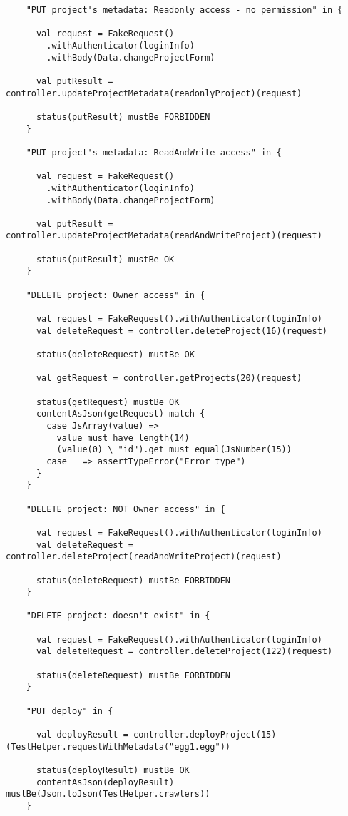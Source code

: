 \begin{lstlisting}
    "PUT project's metadata: Readonly access - no permission" in {

      val request = FakeRequest()
        .withAuthenticator(loginInfo)
        .withBody(Data.changeProjectForm)

      val putResult = controller.updateProjectMetadata(readonlyProject)(request)

      status(putResult) mustBe FORBIDDEN
    }

    "PUT project's metadata: ReadAndWrite access" in {

      val request = FakeRequest()
        .withAuthenticator(loginInfo)
        .withBody(Data.changeProjectForm)

      val putResult = controller.updateProjectMetadata(readAndWriteProject)(request)

      status(putResult) mustBe OK
    }

    "DELETE project: Owner access" in {

      val request = FakeRequest().withAuthenticator(loginInfo)
      val deleteRequest = controller.deleteProject(16)(request)

      status(deleteRequest) mustBe OK

      val getRequest = controller.getProjects(20)(request)

      status(getRequest) mustBe OK
      contentAsJson(getRequest) match {
        case JsArray(value) =>
          value must have length(14)
          (value(0) \ "id").get must equal(JsNumber(15))
        case _ => assertTypeError("Error type")
      }
    }

    "DELETE project: NOT Owner access" in {

      val request = FakeRequest().withAuthenticator(loginInfo)
      val deleteRequest = controller.deleteProject(readAndWriteProject)(request)

      status(deleteRequest) mustBe FORBIDDEN
    }

    "DELETE project: doesn't exist" in {

      val request = FakeRequest().withAuthenticator(loginInfo)
      val deleteRequest = controller.deleteProject(122)(request)

      status(deleteRequest) mustBe FORBIDDEN
    }

    "PUT deploy" in {

      val deployResult = controller.deployProject(15)(TestHelper.requestWithMetadata("egg1.egg"))

      status(deployResult) mustBe OK
      contentAsJson(deployResult) mustBe(Json.toJson(TestHelper.crawlers))
    }


\end{lstlisting}
